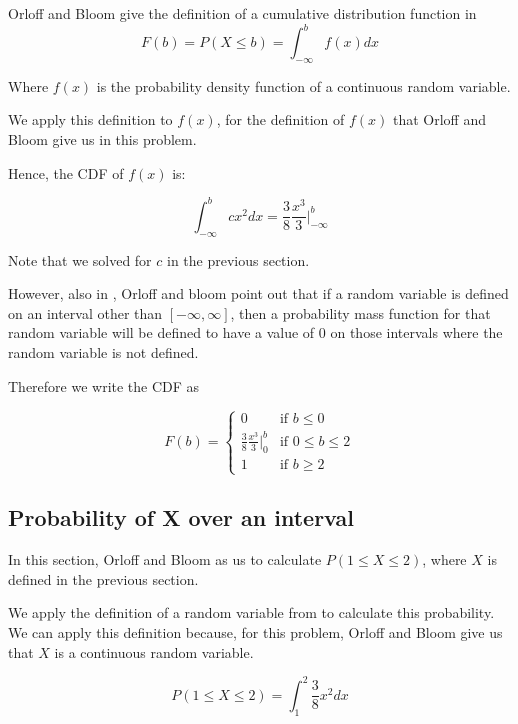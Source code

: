\documentclass[a4paper,11pt]{article}
\begin{document}
Orloff and Bloom give the definition of a cumulative distribution function in
\cite{reading5b}
\begin{equation}
    F \left( b \right) = P \left( X \leq b \right)
      = \int_{-\infty}^{b} f \left( x \right) dx
\end{equation}

Where $f\left( x \right)$ is the probability density function of a continuous
random variable.

We apply this definition to $f\left( x \right)$, for the definition of
$f\left( x \right)$ that Orloff and Bloom give us in this problem.

Hence, the CDF of $f \left( x \right)$ is:

\begin{equation}
    \int_{-\infty}^{b} c x^{2} dx
      = \frac{3}{8} \frac{x^{3}}{3} \bigg\rvert_{-\infty}^{b}
\end{equation}

Note that we solved for $c$ in the previous section.

However, also in \cite{reading5b}, Orloff and bloom point out that if a random
variable is defined on an interval other than $\left[-\infty, \infty \right]$,
then a probability mass function for that random variable will be defined to
have a value of $0$ on those intervals where the random variable is not
defined.

Therefore we write the CDF as

\[
F \left( b \right) =
\begin{cases}
  0 & \text{if } b \leq 0 \\
   \frac{3}{8} \frac{x^{3}}{3} \bigg\rvert_{0}^{b}
    & \text{if } 0 \leq b \leq 2 \\
   1 & \text{if } b \geq 2
\end{cases}
\]
\subsection{Probability of X over an interval}

In this section, Orloff and Bloom as us to calculate
$P \left( 1 \leq X \leq 2 \right)$, where $X$ is defined in the previous
section.

We apply the definition of a random variable from \cite{reading5b} to calculate
this probability. We can apply this definition because, for this problem,
Orloff and Bloom give us that $X$ is a continuous random variable.

\begin{equation}
P \left( 1 \leq X \leq 2 \right) = \int_{1}^{2} \frac{3}{8} x^{2} dx
\end{equation}
\end{document}

